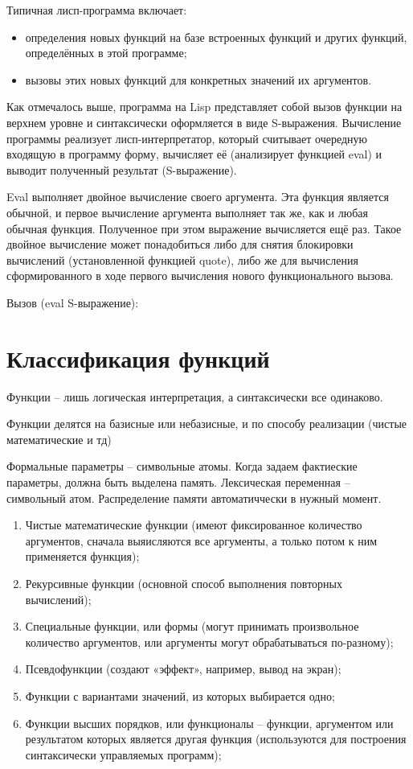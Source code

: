 \documentclass[12pt]{report}
\begin{document}
Типичная лисп-программа включает:
\begin{itemize}
	\item определения новых функций на базе встроенных функций и других функций, определённых в этой программе;
	\item {вызовы этих новых функций для конкретных значений их аргументов.}
\end{itemize}

Как отмечалось выше, программа на Lisp представляет собой вызов функции на верхнем уровне и синтаксически оформляется в виде S-выражения. Вычисление программы реализует лисп-интерпретатор, который считывает очередную входящую в программу форму, вычисляет её (анализирует функцией eval) и выводит полученный результат (S-выражение).

Eval выполняет двойное  вычисление своего аргумента. Эта функция является обычной, и первое  вычисление аргумента выполняет так же, как и любая обычная функция.  Полученное при этом выражение вычисляется ещё раз. Такое двойное  вычисление может понадобиться либо для снятия блокировки вычислений (установленной функцией quote), либо же для вычисления сформированного в ходе первого вычисления нового функционального вызова.


Вызов (eval S-выражение):


\section*{Классификация функций}


Функции -- лишь логическая интерпретация, а синтаксически все одинаково.

Функции делятся на базисные или небазисные, и по способу реализации (чистые математические и тд)

Формальные параметры -- символьные атомы. Когда задаем фактиеские параметры, должна быть выделена память. Лексическая переменная -- символьный атом. Распределение памяти автоматиччески в нужный момент.



\begin{enumerate}
	\item Чистые  математические функции (имеют фиксированное количество аргументов, сначала выяисляются все аргументы, а только потом к ним применяется функция);
	\item Рекурсивные функции (основной способ выполнения повторных вычислений);
	\item Специальные функции, или формы (могут принимать произвольное количество аргументов, или аргументы могут обрабатываться по-разному);
	\item Псевдофункции (создают «эффект», например, вывод на экран);
	\item Функции с вариантами значений, из которых выбирается одно;
	\item Функции высших порядков, или функционалы --  функции, аргументом или  результатом которых является другая функция (используются для построения синтаксически управляемых программ);
\end{enumerate}
\end{document}
